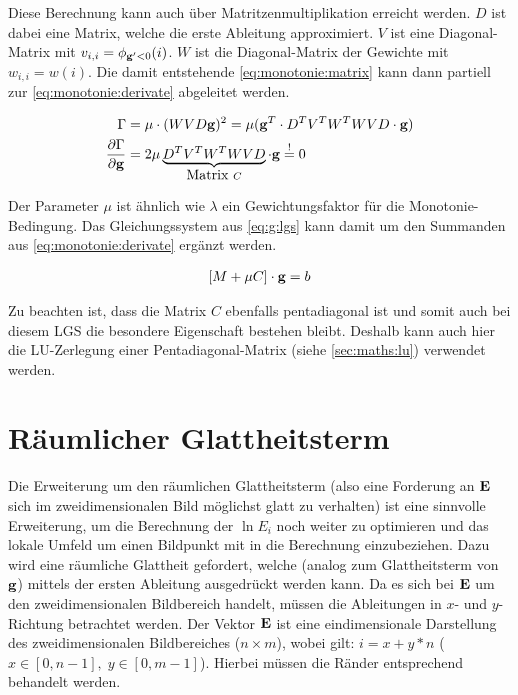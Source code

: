 Diese Berechnung kann auch über Matritzenmultiplikation erreicht werden. $D$ ist dabei eine Matrix, welche die erste Ableitung approximiert. $V$ ist eine Diagonal-Matrix mit $v_{i,i} = \phi_{\mathbf g'<0}(i)$. $W$ ist die Diagonal-Matrix der Gewichte mit $w_{i,i} = w(i)$. Die damit entstehende \autoref{eq:monotonie:matrix} kann dann partiell zur \autoref{eq:monotonie:derivate} abgeleitet werden.

\begin{align}
\label{eq:monotonie:matrix}
\Gamma &= \mu  \cdot (W V  D \mathbf g)^2 = \mu (\mathbf g^T \cdot D^T V^T W^T W V D \cdot \mathbf g)\\
\label{eq:monotonie:derivate}
\frac{\partial \Gamma}{\partial \mathbf g} &= 2 \mu \underbrace{D^T V^T W^T W V D}_{\mbox{Matrix }C}\cdot \mathbf g \overset{!}{=} 0
\end{align}


Der Parameter $\mu$ ist ähnlich wie $\lambda$ ein Gewichtungsfaktor für die Monotonie-Bedingung. Das Gleichungssystem aus \ref{eq:g:lgs} kann damit um den Summanden aus \autoref{eq:monotonie:derivate} ergänzt werden.

\begin{align}
\label{eq:g:monotonie}
[M + \mu C] \cdot \mathbf g = b
\end{align}

Zu beachten ist, dass die Matrix $C$ ebenfalls pentadiagonal ist und somit auch bei diesem \gls{LGS} die besondere Eigenschaft bestehen bleibt. Deshalb kann auch hier die LU-Zerlegung einer \gls{Pentadiagonal-Matrix} (siehe \autoref{sec:maths:lu}) verwendet werden.


\section{Räumlicher Glattheitsterm}
\label{sec:raeumlich}
Die Erweiterung um den räumlichen Glattheitsterm (also eine Forderung an $\mathbf E$ sich im zweidimensionalen Bild möglichst glatt zu verhalten) ist eine sinnvolle Erweiterung, um die Berechnung der $\ln E_i$ noch weiter zu optimieren und das lokale Umfeld um einen Bildpunkt mit in die Berechnung einzubeziehen. Dazu wird eine räumliche Glattheit gefordert, welche (analog zum Glattheitsterm von $\mathbf g$) mittels der ersten Ableitung ausgedrückt werden kann. Da es sich bei $\mathbf E$ um den zweidimensionalen Bildbereich handelt, müssen die Ableitungen in $x$- und $y$-Richtung betrachtet werden. Der Vektor $\mathbf E$ ist eine eindimensionale Darstellung des zweidimensionalen Bildbereiches ($n \times m$), wobei gilt: $i = x+y*n$ ($x \in [0,n-1], \; y \in [0,m-1]$). 
Hierbei müssen die Ränder entsprechend behandelt werden.

